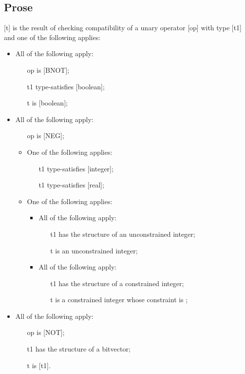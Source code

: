 \documentclass{book}
\begin{document}
\subsection{Prose}
  [t] is the result of checking compatibility of a unary operator [op] with
  type [t1] and one of the following applies:
  \begin{itemize}
  \item  All of the following apply:
    \begin{itemize}
    \item  [op] is [BNOT];
    \item  [t1] type-satisfies [boolean];
    \item  [t] is [boolean];
    \end{itemize}

  \item  All of the following apply:
    \begin{itemize}
    \item  [op] is [NEG];
    \item  One of the following applies:
      \begin{itemize}
      \item  [t1] type-satisfies [integer]; 
      \item  [t1] type-satisfies [real];
      \end{itemize}
     \item  One of the following applies:
       \begin{itemize}
       \item  All of the following apply:
         \begin{itemize}
         \item  [t1] has the structure of an unconstrained integer;
         \item  [t] is an unconstrained integer;
         \end{itemize}
       \item  All of the following apply:
         \begin{itemize}
         \item  [t1] has the structure of a constrained integer;
         \item  [t] is a constrained integer whose constraint is ;
         \end{itemize}
       \end{itemize}
    \end{itemize}  

  \item  All of the following apply:
    \begin{itemize}
    \item  [op] is [NOT];
    \item  [t1] has the structure of a bitvector;
    \item  [t] is [t1].
    \end{itemize}
  \end{itemize}
\end{document}
